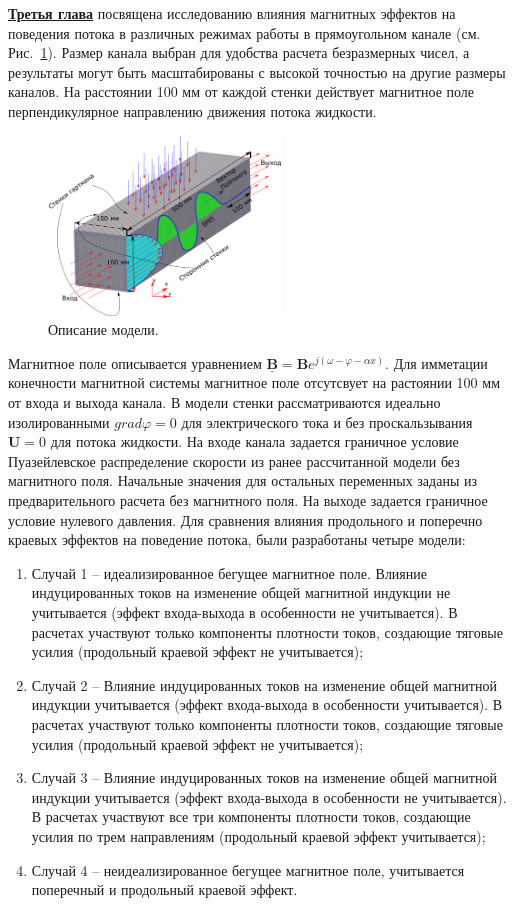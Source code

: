 \underline{\textbf{Третья глава}} посвящена исследованию влияния магнитных эффектов на поведения потока в различных режимах работы в прямоугольном канале  (см. Рис.~\ref{fig:model}). Размер канала выбран для удобства расчета безразмерных чисел, а результаты могут быть масштабированы с высокой точностью на другие размеры каналов.  На расстоянии 100 мм от каждой стенки действует магнитное поле перпендикулярное направлению движения потока жидкости. 
\begin{figure}
	\centering
	\includegraphics[width=0.55\textwidth]{Synopsis/images/part3/Description_ru.png}
	\caption{Описание модели.}
	\label{fig:model}	
\end{figure}
Магнитное поле описывается уравнением $\underline{\mathbf{B}} = \mathbf{B} e^{j(\omega - \varphi - \alpha x)}$. Для имметации конечности магнитной системы магнитное поле отсутсвует на растоянии 100 мм от входа и выхода канала. В модели стенки рассматриваются идеально изолированными $grad \varphi = 0$ для электрического тока и без проскальзывания $\mathbf{U} = 0$ для потока жидкости. На входе канала задается граничное условие Пуазейлевское распределение скорости из ранее рассчитанной модели без магнитного поля. Начальные значения для остальных переменных заданы из предварительного расчета без магнитного поля. На выходе задается граничное условие нулевого давления.
Для сравнения влияния продольного и поперечно краевых эффектов на поведение потока, были разработаны четыре модели:
\begin{enumerate}
	\item Случай 1 -- идеализированное бегущее магнитное поле. Влияние индуцированных токов на изменение общей магнитной индукции не учитывается (эффект входа-выхода в особенности не учитывается). В расчетах участвуют только компоненты плотности токов, создающие тяговые усилия (продольный краевой эффект не учитывается);
	\item Случай 2 --  Влияние индуцированных токов на изменение общей магнитной индукции учитывается (эффект входа-выхода в особенности учитывается). В расчетах участвуют только компоненты плотности токов, создающие тяговые усилия (продольный краевой эффект не учитывается);
	\item Случай 3 -- Влияние индуцированных токов на изменение общей магнитной индукции учитывается (эффект входа-выхода в особенности не учитывается). В расчетах участвуют все три компоненты плотности токов, создающие усилия по трем направлениям (продольный краевой эффект учитывается);
	\item Случай 4 -- неидеализированное бегущее магнитное поле, учитывается поперечный и продольный краевой эффект.  
\end{enumerate}
